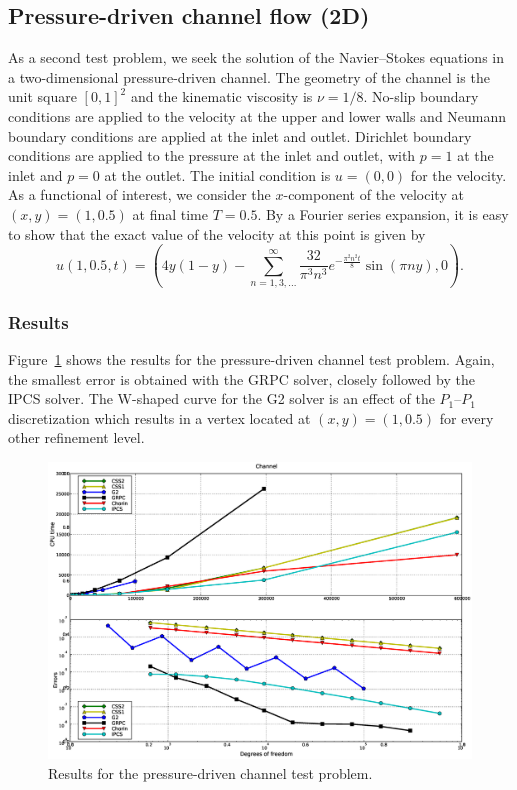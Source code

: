 \subsection{Pressure-driven channel flow (2D)}

As a second test problem, we seek the solution of the Navier--Stokes
equations in a two-dimensional pressure-driven channel. The geometry
of the channel is the unit square $[0, 1]^2$ and the kinematic
viscosity is $\nu = 1/8$. No-slip boundary conditions are applied to
the velocity at the upper and lower walls and Neumann boundary
conditions are applied at the inlet and outlet. Dirichlet boundary
conditions are applied to the pressure at the inlet and outlet, with
$p = 1$ at the inlet and $p = 0$ at the outlet. The initial condition
is $u = (0, 0)$ for the velocity. As a functional of interest, we
consider the $x$-component of the velocity at $(x, y) = (1, 0.5)$ at
final time $T = 0.5$. By a Fourier series expansion, it is easy to
show that the exact value of the velocity at this point is given by
\begin{equation*} \label{eq:exact_channel}
  u(1, 0.5, t) = (4y(1-y) - \sum_{n=1,3,...}^\infty \frac{32}{\pi^3 n^3}
  e^{-\frac{\pi^2 n^2 t}{8}} \sin (\pi n y), 0).
\end{equation*}

\subsubsection{Results}

Figure~\ref{fig:channel_results} shows the results for the
pressure-driven channel test problem. Again, the smallest error is
obtained with the GRPC solver, closely followed by the IPCS solver.
The W-shaped curve for the G2 solver is an effect of the $P_1$--$P_1$
discretization which results in a vertex located at $(x, y) = (1,
0.5)$ for every other refinement level.

\begin{figure}
  \begin{center}
    \includegraphics[width=14cm]{chapters/kvs-1/eps/new_channel_res.eps}
    \caption{Results for the pressure-driven channel test problem.}
    \label{fig:channel_results}
  \end{center}
\end{figure}

